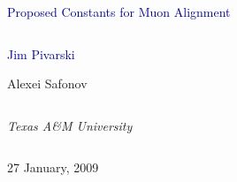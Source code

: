 \documentclass[compress]{beamer}
\begin{document}
\begin{frame}
\vfill
\begin{center}
\textcolor{darkblue}{\Large Proposed Constants for Muon Alignment}

\vfill
\begin{columns}
\begin{center}
\large
\textcolor{darkblue}{Jim Pivarski}

\vspace{0.2 cm}
Alexei Safonov
\end{center}
\end{columns}

\begin{columns}
\begin{center}
\scriptsize
{\it Texas A\&M University}
\end{center}
\end{columns}

\vfill
27 January, 2009

\end{center}
\end{frame}


\small
\end{document}
